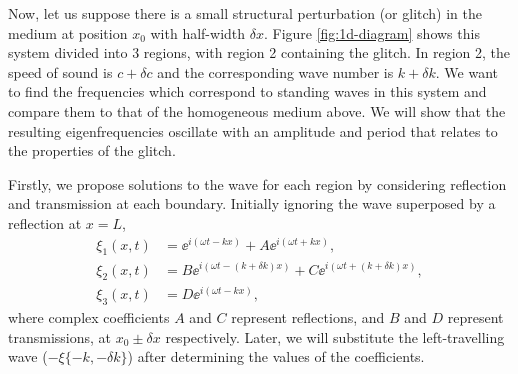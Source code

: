 Now, let us suppose there is a small structural perturbation (or glitch) in the medium at position \(x_0\) with half-width \(\delta x\). Figure \ref{fig:1d-diagram} shows this system divided into 3 regions, with region 2 containing the glitch. In region 2, the speed of sound is \(c + \delta c\) and the corresponding wave number is \(k + \delta k\). We want to find the frequencies which correspond to standing waves in this system and compare them to that of the homogeneous medium above. We will show that the resulting eigenfrequencies oscillate with an amplitude and period that relates to the properties of the glitch.

Firstly, we propose solutions to the wave for each region by considering reflection and transmission at each boundary. Initially ignoring the wave superposed by a reflection at \(x=L\),
%
\begin{align}
    \xi_1(x, t) &= \ee^{i(\omega t - k x)} + A \ee^{i(\omega t + k x)}, \label{eq:xi1-r} \\
    \xi_2(x, t) &= B\ee^{i(\omega t - (k + \delta k) x)} + C \ee^{i(\omega t + (k + \delta k) x)}, \label{eq:xi2-r} \\
    \xi_3(x, t) &= D \ee^{i(\omega t - k x)}, \label{eq:xi3-r}
\end{align}
%
where complex coefficients \(A\) and \(C\) represent reflections, and \(B\) and \(D\) represent transmissions, at \(x_0 \pm \delta x\) respectively. Later, we will substitute the left-travelling wave (\(- \xi\{-k, -\delta k\}\)) after determining the values of the coefficients.

